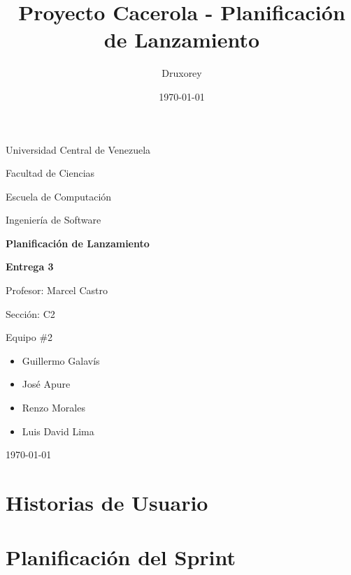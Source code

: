 \documentclass[12pt]{article}
\title{Proyecto Cacerola - Planificación de Lanzamiento} %
\author{Druxorey} %
\date{\today} %
\begin{document}
\begin{titlepage}
	\centering
	\vspace{1cm}
	{\large {Universidad Central de Venezuela}\par}
	{\large {Facultad de Ciencias}\par}
	{\large {Escuela de Computación}\par}
	{\large {Ingeniería de Software}\par}
	\vspace{6cm}
	{\LARGE \textbf{Planificación de Lanzamiento}\par}
	\vspace{0.25cm}
	{\Large \textbf{Entrega 3}\par}
	\vfill
	\begin{flushleft}
		{\large Profesor: Marcel Castro\par\vspace{-0.5em}}
		{\large Sección: C2\par\vspace{-0.5em}}
		{\large Equipo \#2\par\vspace{-1em}}
		\begin{itemize}
			\item Guillermo Galavís\vspace{-0.5em}
			\item José Apure\vspace{-0.5em}
			\item Renzo Morales\vspace{-0.5em}
			\item Luis David Lima\vspace{-0.5em}
		\end{itemize}
	\end{flushleft}
	\vspace{0.5cm}
	\centering
	{\large \today\par}
\end{titlepage}

\section{Historias de Usuario}

\pagebreak
\section{Planificación del Sprint}
\end{document}
